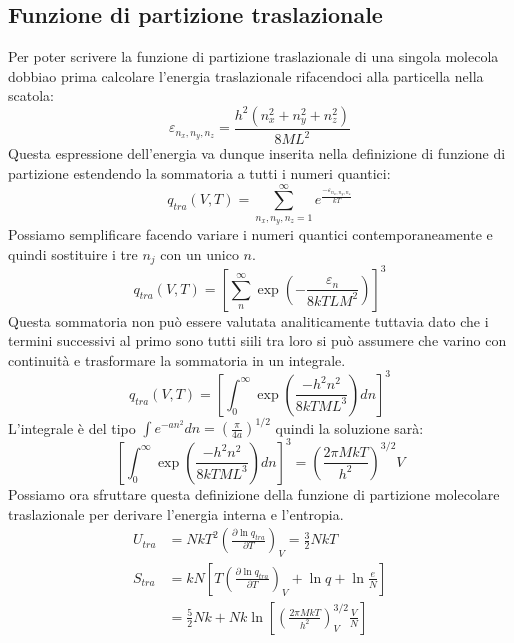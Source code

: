 \documentclass[oneside]{amsbook}
\numberwithin{section}{chapter}
\numberwithin{equation}{section}
\numberwithin{figure}{section}
\begin{document}
\subsection{Funzione di partizione traslazionale}
Per poter scrivere la funzione di partizione traslazionale di una singola molecola dobbiao prima calcolare l'energia traslazionale rifacendoci alla particella nella scatola:
\begin{equation}
\varepsilon_{n_x,n_y,n_z}=\frac{h^2(n_x^2+n_y^2+n_z^2)}{8ML^2}
\end{equation}
Questa espressione dell'energia va dunque inserita nella definizione di funzione di partizione estendendo la sommatoria a tutti i numeri quantici:
\begin{equation}
q_{tra}(V,T)=\sum_{n_x,n_y,n_z=1}^\infty e^\frac{-\varepsilon_{n_x,n_y,n_z}}{kT}
\end{equation}
Possiamo semplificare facendo variare i numeri quantici contemporaneamente e quindi sostituire i tre $n_j$ con un unico $n$.
\begin{equation}
q_{tra}(V,T)=\left[\sum_n^\infty \exp\left(-\frac{\varepsilon_n}{8kTLM^2}\right)\right]^3
\end{equation}
Questa sommatoria non può essere valutata analiticamente tuttavia dato che i termini successivi al primo sono tutti siili tra loro si può assumere che varino con continuità e trasformare la sommatoria in un integrale.
\begin{equation}
q_{tra}(V,T)=\left[	\int_0^\infty \exp\left(\frac{-h^2n^2}{8kTML^3}\right)dn\right]^3
\end{equation}
L'integrale è del tipo $\int e^{-an^2}dn=\left(\frac{\pi}{4a}\right)^{1/2}$ quindi la soluzione sarà:
\begin{equation}
\left[	\int_0^\infty \exp\left(\frac{-h^2n^2}{8kTML^3}\right)dn\right]^3=\left(\frac{2\pi MkT}{h^2}\right)^{3/2}V
\end{equation}
Possiamo ora sfruttare questa definizione della funzione di partizione molecolare traslazionale per derivare l'energia interna e l'entropia.
\begin{equation}
\begin{aligned}
U_{tra}&=NkT^2\left(\frac{\partial\ln q_{tra}}{\partial T}\right)_{V}=\frac{3}{2}NkT\\
S_{tra}&=kN\left[T\left(\frac{\partial\ln q_{tra}}{\partial T}\right)_{V}+\ln q+\ln\frac{e}{N}\right]\\
&=\frac{5}{2}Nk+Nk\ln\left[\left(\frac{2\pi MkT}{h^2}\right)_V^{3/2}\frac{V}{N}\right]
\end{aligned}
\end{equation}
\end{document}
